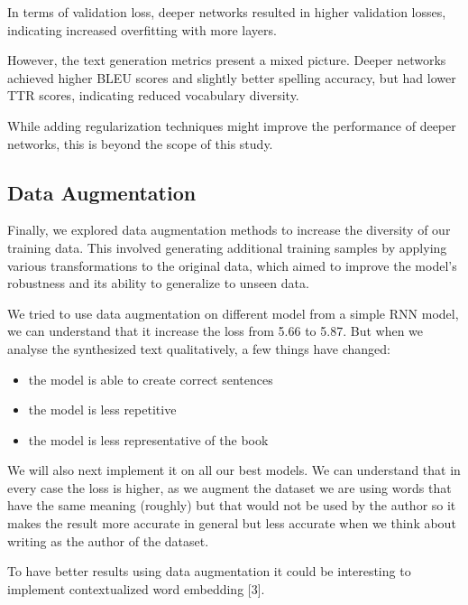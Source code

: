 \documentclass{article}
\begin{document}
In terms of validation loss, deeper networks resulted in higher validation losses, indicating increased overfitting with more layers.

However, the text generation metrics present a mixed picture. Deeper networks achieved higher BLEU scores and slightly better spelling accuracy, but had lower TTR scores, indicating reduced vocabulary diversity.

While adding regularization techniques might improve the performance of deeper networks, this is beyond the scope of this study.



\subsection{Data Augmentation}

Finally, we explored data augmentation methods to increase the diversity of our training data. This involved generating additional training samples by applying various transformations to the original data, which aimed to improve the model's robustness and its ability to generalize to unseen data.

We tried to use data augmentation on different model from a simple RNN model, we can understand that it increase the loss from 5.66 to 5.87. But when we analyse the synthesized text qualitatively, a few things have changed:
\begin{itemize}
    \item the model is able to create correct sentences
    \item the model is less repetitive 
    \item the model is less representative of the book
\end{itemize}
We will also next implement it on all our best models. 
We can understand that in every case the loss is higher, as we augment the dataset we are using words that have the same meaning (roughly) but that would not be used by the author so it makes the result more accurate in general but less accurate when we think about writing as the author of the dataset.

To have better results using data augmentation it could be interesting to implement contextualized word embedding [3].
\end{document}
